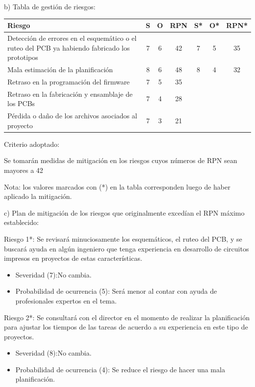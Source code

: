 \documentclass[
11pt, %
codirector, %
]{charter}
\begin{document}
b) Tabla de gestión de riesgos: 

\begin{table}[htpb]
\centering
\begin{tabularx}{\linewidth}{@{}|X|c|c|c|c|c|c|@{}}
\hline
\rowcolor[HTML]{C0C0C0} 
Riesgo & S & O & RPN & S* & O* & RPN* \\ \hline
Detección de errores en el esquemático o el ruteo del PCB ya habiendo fabricado los prototipos&   7&   6&     42&    7&    5&      35\\ \hline
Mala estimación de la planificación      &   8&   6&     48&    8&    4&      32\\ \hline
Retraso en la programación del firmware       &   7&   5&     35&    &    &      \\ \hline
Retraso en la fabricación y ensamblaje de los PCBs       &   7&   4&     28&    &    &      \\ \hline
Pérdida o daño de los archivos asociados al proyecto      &   7&   3&     21&    &    &      \\ \hline
\end{tabularx}%
\end{table}

Criterio adoptado: 

Se tomarán medidas de mitigación en los riesgos cuyos números de RPN sean mayores a 42

Nota: los valores marcados con (*) en la tabla corresponden luego de haber aplicado la mitigación.

c) Plan de mitigación de los riesgos que originalmente excedían el RPN máximo establecido:
 
Riesgo 1*:  Se revisará minuciosamente los esquemáticos, el ruteo del PCB, y se buscará ayuda en algún ingeniero que tenga experiencia en desarrollo de circuitos impresos en proyectos de estas características.
  \begin{itemize}
	\item Severidad (7):No cambia.
	\item Probabilidad de ocurrencia (5): Será menor al contar con ayuda de profesionales expertos en el tema.
\end{itemize}

Riesgo 2*: Se consultará con el director en el momento de realizar la planificación para ajustar los tiempos de las tareas de acuerdo a su experiencia en este tipo de proyectos.
  \begin{itemize}
	\item Severidad (8):No cambia.
	\item Probabilidad de ocurrencia (4): Se reduce el riesgo de hacer una mala planificación.
\end{itemize}
\end{document}
